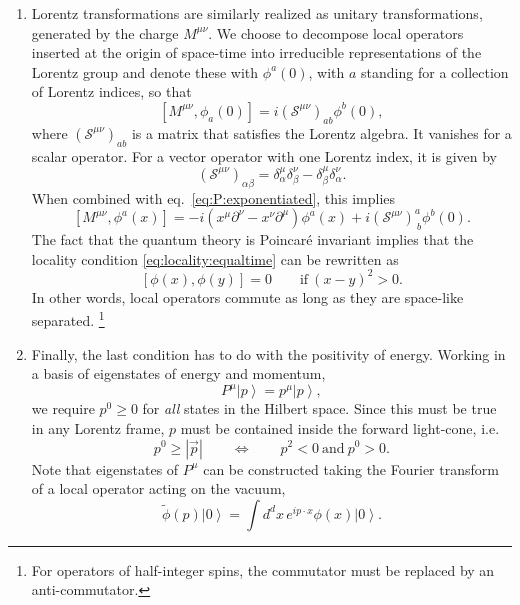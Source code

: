 \documentclass[a4paper,12pt]{article}
\newcommand{\ket}[1]{\left| #1 \right\rangle}
\numberwithin{equation}{section}
\begin{document}
\begin{enumerate}
\item
Lorentz transformations are similarly realized as unitary transformations, generated by the charge $M^{\mu\nu}$.
We choose to decompose local operators inserted at the origin of space-time into irreducible representations of the Lorentz group and denote these with $\phi^a(0)$, with $a$ standing for a collection of Lorentz indices, so that
\begin{equation}
	\left[ M^{\mu\nu}, \phi_a(0) \right]
	= i \left( \mathcal{S}^{\mu\nu} \right)_{ab} \phi^b(0),
\end{equation}
where $\left( \mathcal{S}^{\mu\nu} \right)_{ab}$ is a matrix that satisfies the Lorentz algebra. It vanishes for a scalar operator. For a vector operator with one Lorentz index, it is given by
\begin{equation}
	\left( \mathcal{S}^{\mu\nu} \right)_{\alpha\beta}
	= \delta^\mu_\alpha \delta^\nu_\beta
	- \delta^\mu_\beta \delta^\nu_\alpha.
	\label{eq:spinop:vector}
\end{equation}
When combined with eq.~\eqref{eq:P:exponentiated}, this implies
\begin{equation}
	\left[ M^{\mu\nu}, \phi^a(x) \right] = 
	-i \left( x^\mu \partial^\nu - x^\nu \partial^\mu \right) \phi^a(x)
	+ i \left( \mathcal{S}^{\mu\nu} \right)^a_{~b} \phi^b(0).
	\label{eq:commutator:M}
\end{equation}
The fact that the quantum theory is Poincaré invariant implies that the locality condition \eqref{eq:locality:equaltime} can be rewritten as
\begin{equation}
	\left[ \phi(x), \phi(y) \right] = 0
	\qquad
	\text{if}~(x-y)^2 > 0.
	\label{eq:causality}
\end{equation}
In other words, local operators commute as long as they are space-like separated.%
%
\footnote{For operators of half-integer spins, the commutator must be replaced by an anti-commutator.} 
%

\item
Finally, the last condition has to do with the positivity of energy.
Working in a basis of eigenstates of energy and momentum, 
\begin{equation}
	P^\mu \ket{p} = p^\mu \ket{p},
\end{equation}
we require $p^0 \geq 0$ for \emph{all} states in the Hilbert space. Since this must be true in any Lorentz frame, $p$ must be contained inside the forward light-cone, i.e.
\begin{equation}
	p^0 \geq \left| \vec{p} \right|
	\qquad \Leftrightarrow \qquad
	p^2 < 0 ~\text{and}~ p^0 > 0.
	\label{eq:forwardcone}
\end{equation}
Note that eigenstates of $P^\mu$ can be constructed taking the Fourier transform of a local operator acting on the vacuum,
\begin{equation}
	\widetilde{\phi}(p) \ket{0}
	= \int d^dx \, e^{i p \cdot x} \phi(x) \ket{0}.
	\label{eq:momentumspace}
\end{equation}

\end{enumerate}
\end{document}
